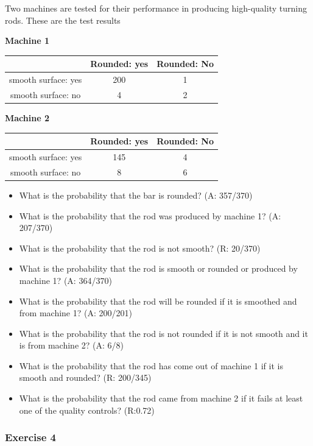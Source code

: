 \documentclass[
]{book}
\providecommand{\tightlist}{%
  \setlength{\itemsep}{0pt}\setlength{\parskip}{0pt}}
\begin{document}
Two machines are tested for their performance in producing high-quality turning rods. These are the test results

\textbf{Machine 1}

\begin{longtable}[]{@{}ccc@{}}
\toprule
& Rounded: yes & Rounded: No \\
\midrule
\endhead
smooth surface: yes & 200 & 1 \\
smooth surface: no & 4 & 2 \\
\bottomrule
\end{longtable}

\textbf{Machine 2}

\begin{longtable}[]{@{}ccc@{}}
\toprule
& Rounded: yes & Rounded: No \\
\midrule
\endhead
smooth surface: yes & 145 & 4 \\
smooth surface: no & 8 & 6 \\
\bottomrule
\end{longtable}

\begin{itemize}
\tightlist
\item
  What is the probability that the bar is rounded? (A: 357/370)
\item
  What is the probability that the rod was produced by machine 1? (A: 207/370)
\item
  What is the probability that the rod is not smooth? (R: 20/370)
\item
  What is the probability that the rod is smooth or rounded or produced by machine 1? (A: 364/370)
\item
  What is the probability that the rod will be rounded if it is smoothed and from machine 1? (A: 200/201)
\item
  What is the probability that the rod is not rounded if it is not smooth and it is from machine 2? (A: 6/8)
\item
  What is the probability that the rod has come out of machine 1 if it is smooth and rounded? (R: 200/345)
\item
  What is the probability that the rod came from machine 2 if it fails at least one of the quality controls? (R:0.72)
\end{itemize}

\hypertarget{exercise-4}{%
\subsubsection{Exercise 4}\label{exercise-4}}
\end{document}
